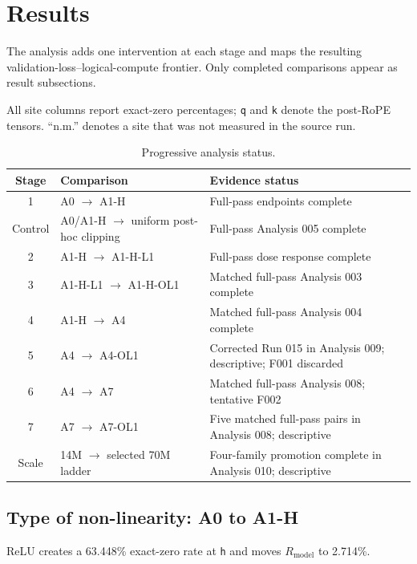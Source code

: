 \documentclass[10pt,a4paper]{article}
\newcommand{\Rmodel}{\ensuremath{R_{\mathrm{model}}}}
\newcommand{\code}[1]{\texttt{#1}}
\begin{document}
\section{Results}

The analysis adds one intervention at each stage and maps the resulting validation-loss--logical-compute frontier. Only completed comparisons appear as result subsections.

All site columns report exact-zero percentages; \code{q} and \code{k} denote the post-RoPE tensors. ``n.m.'' denotes a site that was not measured in the source run.

{\small
\begin{table}[htbp]
\centering
\caption{Progressive analysis status.}
\label{tab:analysis-status}
\begin{tabularx}{\textwidth}{@{}c p{43mm}Y@{}}
\toprule
\textbf{Stage} & \textbf{Comparison} & \textbf{Evidence status} \\
 & A0 $\rightarrow$ A1-H & Full-pass endpoints complete \\
Control & A0/A1-H $\rightarrow$ uniform post-hoc clipping & Full-pass Analysis 005 complete \\
2 & A1-H $\rightarrow$ A1-H-L1 & Full-pass dose response complete \\
3 & A1-H-L1 $\rightarrow$ A1-H-OL1 & Matched full-pass Analysis 003 complete \\
4 & A1-H $\rightarrow$ A4 & Matched full-pass Analysis 004 complete \\
5 & A4 $\rightarrow$ A4-OL1 & Corrected Run 015 in Analysis 009; descriptive; F001 discarded \\
6 & A4 $\rightarrow$ A7 & Matched full-pass Analysis 008; tentative F002 \\
7 & A7 $\rightarrow$ A7-OL1 & Five matched full-pass pairs in Analysis 008; descriptive \\
Scale & 14M $\rightarrow$ selected 70M ladder & Four-family promotion complete in Analysis 010; descriptive \\
\bottomrule
\end{tabularx}
\end{table}}
\FloatBarrier

\subsection{Type of non-linearity: A0 to A1-H}

ReLU creates a 63.448\% exact-zero rate at \code{h} and moves \Rmodel{} to 2.714\%.
\end{document}
